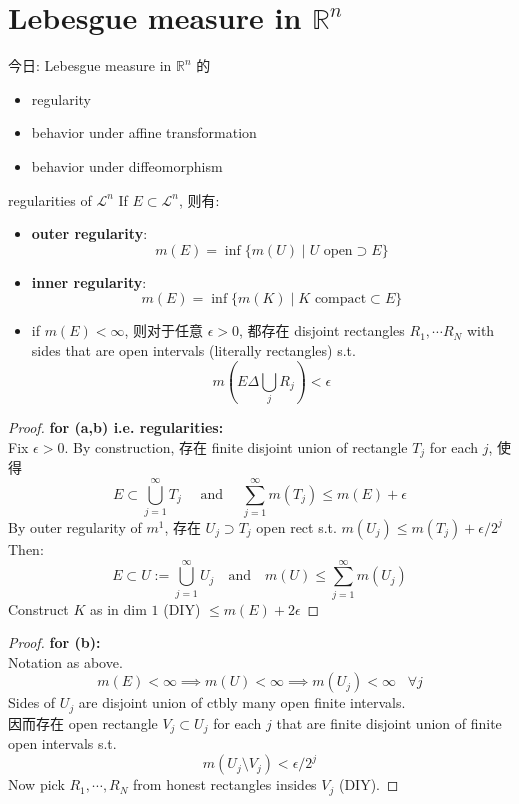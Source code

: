 \documentclass[lang=cn,11pt]{elegantbook}
\begin{document}
\chapter{Lebesgue measure in $\mathbb{R}^n$}
今日: Lebesgue measure in $\mathbb{R}^n$ 的 \begin{itemize}
    \item regularity
    \item behavior under affine transformation
    \item behavior under diffeomorphism
\end{itemize}



\begin{theorem}{regularities of $\mathcal{L}^n$}
If $E \subset \mathcal{L}^n$, 则有: 
\begin{itemize}
    \item \textbf{outer regularity}: \[ m(E) = \inf \{  m(U) \mid U  \text{ open}   \supset E\}  \]
    \item \textbf{inner regularity}: \[ m(E) = \inf \{  m(K) \mid K  \text{ compact}   \subset E\}  \]
    \item if $m(E) < \infty$, 则对于任意 $\epsilon > 0$, 都存在 disjoint rectangles $R_1, \cdots R_N$ with sides that are open intervals (literally rectangles) s.t. \[ m(E  \Delta \bigcup_{j} R_j ) < \epsilon \]
\end{itemize}
\end{theorem}
\begin{proof}
 \textbf{   for (a,b) i.e. regularities: }\\
 Fix $\epsilon > 0 $. By construction, 存在 finite disjoint union of rectangle $T_j$ for each $j$, 使得 \[
 E \subset \bigcup_{j=1}^\infty T_j \quad \text{ and } \quad \sum_{j=1}^\infty m(T_j) \leq m(E) + \epsilon
 \]
By outer regularity of $m^1$, 存在 $U_j \supset T_j$ open rect s.t. $m(U_j) \leq m(T_j) + \epsilon / 2^j$
Then: \[
E \subset U := \bigcup_{j=1}^\infty U_j \quad \text{and} \quad m(U) \leq \sum_{j=1}^\infty m(U_j)
\]
Construct $K$ as in dim $1$ (DIY) $\leq m(E) + 2\epsilon$
\end{proof}
\begin{proof}
 \textbf{   for (b):} \\
Notation as above.\\
\[
m(E) < \infty \implies m(U) < \infty \implies m(U_j)  < \infty \;\; \; \forall j
\]
Sides of $U_j$ are disjoint union of ctbly many open finite intervals.\\
因而存在 open rectangle $V_j \subset U_j$ for each $j$ that are finite disjoint union of finite open intervals s.t. \[
m(U_j  \setminus   V_j) < \epsilon / 2^j
\]
Now pick $R_1, \cdots, R_N$ from honest rectangles insides $V_j$ (DIY).
\end{proof}
\end{document}
